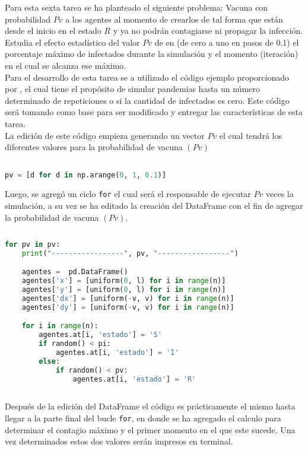 \documentclass{article}
\begin{document}
Para esta sexta tarea se ha planteado el siguiente problema: Vacuna con probabilidad $Pv$ a los agentes al momento de crearlos de tal forma que están desde el inicio en el estado $R$ y ya no podrán contagiarse ni propagar la infección. Estudia el efecto estadístico del valor $Pv$ de en (de cero a uno en pasos de 0.1) el porcentaje máximo de infectados durante la simulación y el momento (iteración) en el cual se alcanza ese máximo.\\

Para el desarrollo de esta tarea se a utilizado el código ejemplo proporcionado por \citet{DRA.Code}, el cual tiene el propósito de simular pandemias hasta un número determinado de repeticiones o si la cantidad de infectados es cero. Este código será tomando como base para ser modificado y entregar las características de esta tarea.\\

La edición de este código empieza generando un vector $Pv$ el cual tendrá los diferentes valores para la probabilidad de vacuna $(Pv)$ 

\begin{lstlisting}[language=Python]

pv = [d for d in np.arange(0, 1, 0.1)]

 \end{lstlisting}

Luego, se agregó un ciclo \texttt{for} el cual será el responsable de ejecutar $Pv$ veces la simulación, a su vez se ha editado la creación del DataFrame con el fin de agregar la probabilidad de vacuna $(Pv)$.
 
 \begin{lstlisting}[language=Python]
 
for pv in pv:
    print("-----------------", pv, "-----------------")

    agentes =  pd.DataFrame()
    agentes['x'] = [uniform(0, l) for i in range(n)]
    agentes['y'] = [uniform(0, l) for i in range(n)]
    agentes['dx'] = [uniform(-v, v) for i in range(n)]
    agentes['dy'] = [uniform(-v, v) for i in range(n)]

    for i in range(n):
        agentes.at[i, 'estado'] = 'S'
        if random() < pi:
            agentes.at[i, 'estado'] = 'I'
        else:
            if random() < pv:
                agentes.at[i, 'estado'] = 'R'
                
 \end{lstlisting}

Después de la edición del DataFrame el código es prácticamente el mismo hasta llegar a la parte final del bucle \texttt{for}, en donde se ha agregado el calculo para determinar el contagio máximo y el primer momento en el que este sucede. Una vez determinados estos dos valores serán impresos en terminal.
\end{document}
